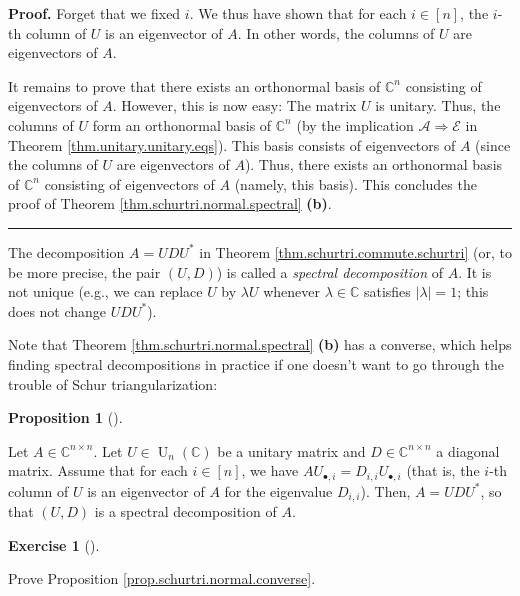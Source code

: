\documentclass[numbers=enddot,12pt,final,onecolumn,notitlepage]{scrartcl}%
\newcounter{exer}
\numberwithin{exer}{subsection}
\theoremstyle{definition}
\newtheorem{prop}[theo]{Proposition}
\newenvironment{proposition}[1][]
{\begin{prop}[#1]\begin{leftbar}}
{\end{leftbar}\end{prop}}
\newtheorem{exmp}[exer]{Exercise}
\newenvironment{exercise}[1][]
{\begin{exmp}[#1]\begin{leftbar}}
{\end{leftbar}\end{exmp}}
\newenvironment{proof}[1][Proof]{\noindent\textbf{#1.} }{\ \rule{0.5em}{0.5em}}
\begin{document}
\begin{proof}
Forget that we fixed $i$. We thus have shown that for each $i\in\left[
n\right]  $, the $i$-th column of $U$ is an eigenvector of $A$. In other
words, the columns of $U$ are eigenvectors of $A$.

It remains to prove that there exists an orthonormal basis of $\mathbb{C}^{n}$
consisting of eigenvectors of $A$. However, this is now easy: The matrix $U$
is unitary. Thus, the columns of $U$ form an orthonormal basis of
$\mathbb{C}^{n}$ (by the implication $\mathcal{A}\Longrightarrow\mathcal{E}$
in Theorem \ref{thm.unitary.unitary.eqs}). This basis consists of eigenvectors
of $A$ (since the columns of $U$ are eigenvectors of $A$). Thus, there exists
an orthonormal basis of $\mathbb{C}^{n}$ consisting of eigenvectors of $A$
(namely, this basis). This concludes the proof of Theorem
\ref{thm.schurtri.normal.spectral} \textbf{(b)}.
\end{proof}

The decomposition $A=UDU^{\ast}$ in Theorem
\ref{thm.schurtri.commute.schurtri} (or, to be more precise, the pair $\left(
U,D\right)  $) is called a \emph{spectral decomposition} of $A$. It is not
unique (e.g., we can replace $U$ by $\lambda U$ whenever $\lambda\in
\mathbb{C}$ satisfies $\left\vert \lambda\right\vert =1$; this does not change
$UDU^{\ast}$).

Note that Theorem \ref{thm.schurtri.normal.spectral} \textbf{(b)} has a
converse, which helps finding spectral decompositions in practice if one
doesn't want to go through the trouble of Schur triangularization:

\begin{proposition}
\label{prop.schurtri.normal.converse}Let $A\in\mathbb{C}^{n\times n}$. Let
$U\in\operatorname*{U}\nolimits_{n}\left(  \mathbb{C}\right)  $ be a unitary
matrix and $D\in\mathbb{C}^{n\times n}$ a diagonal matrix. Assume that for
each $i\in\left[  n\right]  $, we have $AU_{\bullet,i}=D_{i,i}U_{\bullet,i}$
(that is, the $i$-th column of $U$ is an eigenvector of $A$ for the eigenvalue
$D_{i,i}$). Then, $A=UDU^{\ast}$, so that $\left(  U,D\right)  $ is a spectral
decomposition of $A$.
\end{proposition}

\begin{exercise}
 Prove Proposition \ref{prop.schurtri.normal.converse}.
\end{exercise}
\end{document}
